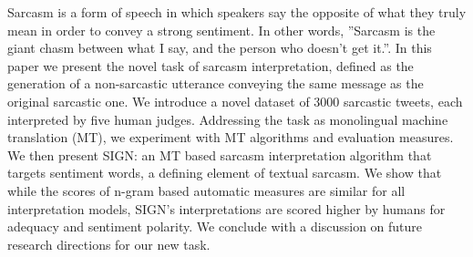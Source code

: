 Sarcasm is a form of speech in which speakers say the opposite of what they truly mean in order to convey a strong sentiment. In other words, ''Sarcasm is the giant chasm between what I say, and the person who doesn't get it.''. In this paper we present the novel task of sarcasm interpretation, defined as the generation of a non-sarcastic utterance conveying the same message as the original sarcastic one. We introduce a novel dataset of 3000 sarcastic tweets, each interpreted by five human judges. Addressing the task as monolingual machine translation (MT), we experiment with MT algorithms and evaluation measures. We then present SIGN: an MT based sarcasm interpretation algorithm that targets sentiment words, a defining element of textual sarcasm. We show that while the scores of n-gram based automatic measures are similar for all interpretation models, SIGN's interpretations are scored higher by humans for adequacy and sentiment polarity. We conclude with a discussion on future research directions for our new task.
